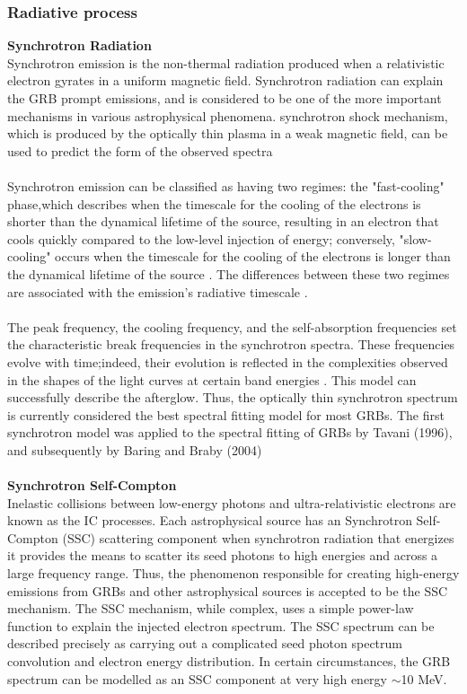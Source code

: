 \subsubsection{Radiative process}
\textbf{ Synchrotron Radiation}\\
Synchrotron emission is the non-thermal radiation produced when a relativistic
electron gyrates in a uniform magnetic field. Synchrotron radiation can explain
the GRB prompt emissions, and is considered to be one of the more important
mechanisms in various astrophysical phenomena.  synchrotron shock mechanism,
which is produced by the optically thin plasma in a weak magnetic field, can be
used to predict the form of the observed spectra \citep{1}\citep{15} \citep{18}\\\\
Synchrotron emission can be classified as having two regimes: the "fast-cooling"
phase,which describes when the timescale for the cooling of the electrons is shorter
than the dynamical lifetime of the source, resulting in an electron that cools quickly compared to the low-level injection of energy; conversely, "slow-cooling" occurs when the timescale for the cooling of the electrons is longer than the dynamical lifetime of the source . The differences between these two regimes are associated with the emission’s radiative timescale \citep{9} \citep{10}.\\\\
The peak frequency, the cooling frequency, and the self-absorption frequencies set
the characteristic break frequencies in the synchrotron spectra. These frequencies
evolve with time;indeed, their evolution is reflected in the complexities observed in
the shapes of the light curves at certain band energies . This model can successfully
describe the afterglow. Thus, the optically thin synchrotron spectrum is currently
considered the best spectral fitting model for most GRBs. The first synchrotron  model was applied to the spectral fitting of GRBs by Tavani (1996), and subsequently  by Baring and Braby (2004)\citep{15}\citep{22}\\\\
\textbf{Synchrotron Self-Compton}\\
Inelastic collisions between low-energy photons and ultra-relativistic electrons are
known as the IC processes. Each astrophysical source has an Synchrotron Self-
Compton (SSC) scattering component when synchrotron radiation that energizes
it provides the means to scatter its seed photons to high energies and across a large
frequency range. Thus, the phenomenon responsible for creating high-energy emissions from GRBs and other astrophysical sources is accepted to be the SSC mechanism. The SSC mechanism, while complex, uses a simple power-law function to explain the injected electron spectrum. The SSC spectrum can be described precisely as carrying out a complicated seed photon spectrum convolution and electron energy distribution. In certain circumstances, the GRB spectrum can be modelled as an SSC component at very high energy $ \sim $10 MeV.\citep{11}\citep{16} 
